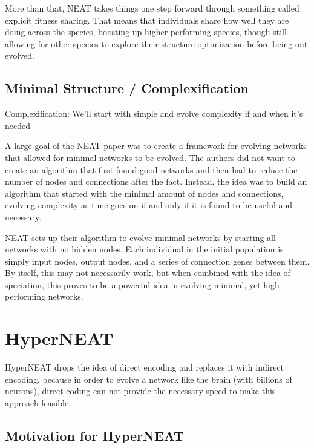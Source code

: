 \documentclass[journal, a4paper]{IEEEtran}
\begin{document}
More than that, NEAT takes things one step forward through something called explicit fitness sharing. That means that individuals share how well they are doing across the species, boosting up higher performing species, though still allowing for other species to explore their structure optimization before being out evolved. \cite{cite02}

\subsection{Minimal Structure / Complexification}

Complexification: We’ll start with simple and evolve complexity if and when it’s needed

A large goal of the NEAT paper was to create a framework for evolving networks that allowed for minimal networks to be evolved. The authors did not want to create an algorithm that first found good networks and then had to reduce the number of nodes and connections after the fact. Instead, the idea was to build an algorithm that started with the minimal amount of nodes and connections, evolving complexity as time goes on if and only if it is found to be useful and necessary. \cite{cite02}

NEAT sets up their algorithm to evolve minimal networks by starting all networks with no hidden nodes. Each individual in the initial population is simply input nodes, output nodes, and a series of connection genes between them. By itself, this may not necessarily work, but when combined with the idea of speciation, this proves to be a powerful idea in evolving minimal, yet high-performing networks. \cite{cite02}




\section{HyperNEAT}

HyperNEAT drops the idea of direct encoding and replaces it with indirect encoding, because in order to evolve a network like the brain (with billions of neurons), direct coding can not provide the necessary speed to make this approach feasible.

\subsection{Motivation for HyperNEAT}
\end{document}

